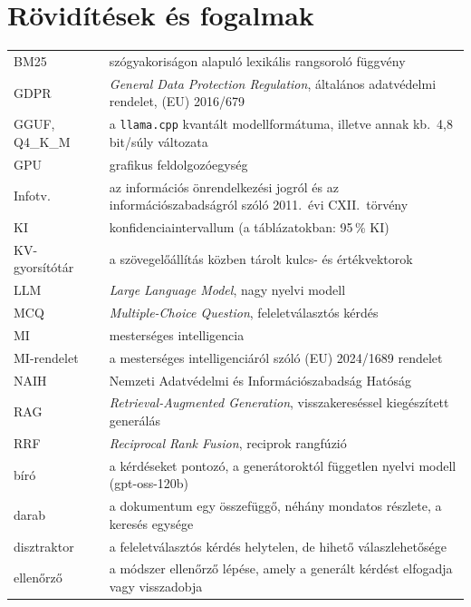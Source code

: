 \chapter*{Rövidítések és fogalmak}
\thispagestyle{plain}

\begin{singlespace}
\small
\begin{longtable}{@{}p{3.2cm}p{11.6cm}@{}}
BM25 & szógyakoriságon alapuló lexikális rangsoroló függvény\\
GDPR & \emph{General Data Protection Regulation}, általános adatvédelmi rendelet, (EU) 2016/679\\
GGUF, Q4\_K\_M & a \texttt{llama.cpp} kvantált modellformátuma, illetve annak kb.\ 4,8 bit/súly változata\\
GPU & grafikus feldolgozóegység\\
Infotv. & az információs önrendelkezési jogról és az információszabadságról szóló 2011.~évi CXII.\ törvény\\
KI & konfidenciaintervallum (a táblázatokban: 95\,\% KI)\\
KV-gyorsítótár & a szövegelőállítás közben tárolt kulcs- és értékvektorok\\
LLM & \emph{Large Language Model}, nagy nyelvi modell\\
MCQ & \emph{Multiple-Choice Question}, feleletválasztós kérdés\\
MI & mesterséges intelligencia\\
MI-rendelet & a mesterséges intelligenciáról szóló (EU) 2024/1689 rendelet\\
NAIH & Nemzeti Adatvédelmi és Információszabadság Hatóság\\
RAG & \emph{Retrieval-Augmented Generation}, visszakereséssel kiegészített generálás\\
RRF & \emph{Reciprocal Rank Fusion}, reciprok rangfúzió\\[3pt]
bíró & a kérdéseket pontozó, a generátoroktól független nyelvi modell (gpt-oss-120b)\\
darab & a dokumentum egy összefüggő, néhány mondatos részlete, a keresés egysége\\
disztraktor & a feleletválasztós kérdés helytelen, de hihető válaszlehetősége\\
ellenőrző & a \Mimir{} módszer ellenőrző lépése, amely a generált kérdést elfogadja vagy visszadobja\\

\end{longtable}
\end{singlespace}
